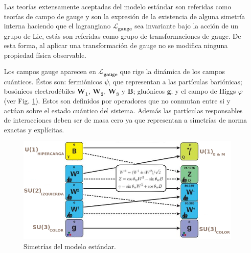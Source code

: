 
Las teorías extensamente aceptadas del modelo estándar son referidas como teorías de campo de gauge y son la expresión de la existencia de alguna simetría interna haciendo que el lagrangiano $\mathcal{L}_{\mathbf{gauge}}$ sea invariante bajo la acción de un grupo de Lie, estás son referidas como grupo de transformaciones de gauge. De esta forma, al aplicar una transformación de gauge no se modifica ninguna propiedad física observable.

Los campos gauge aparecen en $\mathcal{L}_{\mathbf{gauge}}$ que rige la dinámica de los campos cuánticos. Éstos son: fermiónicos $\psi$, que representan a las partículas bariónicas; bosónicos electrodébiles $\mathbf{W_1}$, $\mathbf{W_2} $, $\mathbf{W_3}$ y $\mathbf{B}$; gluónicos $\mathbf{g}$; y el campo de Higgs $\varphi$ (ver Fig. \ref{simetrias}). Estos son definidos por operadores que no conmutan entre si y actúan sobre el estado cuántico del sistema. Además las partículas responsables de interacciones deben ser de masa cero ya que representan a simetrías de norma exactas y explícitas.
 
\begin{figure}[!t]
\centering
\includegraphics[width=1\textwidth]{Fisica_de_Particulas/imagenes/simetria0.png}
\caption[Simetrías del modelo estándar]{Simetrías del modelo estándar.\footnotemark}
\label{simetrias}
\end{figure}

